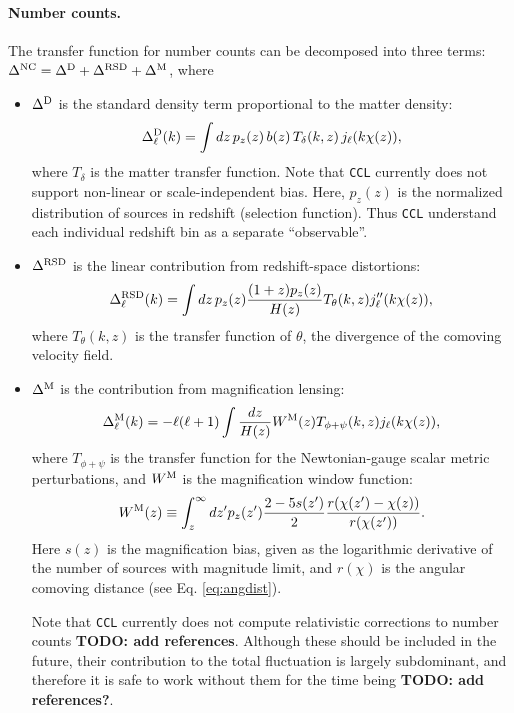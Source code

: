 \documentclass[\docopts]{\docclass}
\begin{document}
\paragraph{\bf Number counts.} The transfer function for number counts can be decomposed into three terms: $\Delta^{\rm NC}=\Delta^{\rm D}+\Delta^{\rm RSD}+\Delta^{\rm M}$, where
\begin{itemize}
  \item $\Delta^{\rm D}$ is the standard density term proportional to the matter density:
        \begin{equation}
          \Delta^{\rm D}_\ell(k)=\int dz\,p_z(z)\,b(z)\,T_\delta(k,z)\,j_\ell(k\chi(z)),
        \end{equation}
        where $T_\delta$ is the matter transfer function. Note that {\tt CCL} currently does not support non-linear or scale-independent bias. Here, $p_z(z)$ is the normalized distribution of sources in redshift (selection function). Thus {\tt CCL} understand each individual redshift bin as a separate ``observable''.
  \item $\Delta^{\rm RSD}$ is the linear contribution from redshift-space distortions:
        \begin{equation}
          \Delta^{\rm RSD}_\ell(k)=\int dz\,p_z(z)\frac{(1+z) p_z(z)}{H(z)}T_\theta(k,z) j_\ell''(k\chi(z)),
        \end{equation}
        where $T_\theta(k,z)$ is the transfer function of $\theta$, the divergence of the comoving velocity field.
  \item $\Delta^{\rm M}$ is the contribution from magnification lensing:
        \begin{equation}
          \Delta_\ell^{\rm M}(k)=-\ell(\ell+1)\int \frac{dz}{H(z)} W^{\rm M}(z) T_{\phi+\psi}(k,z) j_\ell(k\chi(z)),
        \end{equation}
        where $T_{\phi+\psi}$ is the transfer function for the Newtonian-gauge scalar metric perturbations, and $W^{\rm M}$ is the magnification window function:
        \begin{equation}
           W^{\rm M}(z)\equiv\int_z^\infty dz' p_z(z')\frac{2-5s(z')}{2}\frac{r(\chi(z')-\chi(z))}{r(\chi(z'))}.
        \end{equation}
        Here $s(z)$ is the magnification bias, given as the logarithmic derivative of the number of sources with magnitude limit, and $r(\chi)$ is the angular comoving distance (see Eq. \ref{eq:angdist}).
          
        Note that {\tt CCL} currently does not compute relativistic corrections to number counts {\bf TODO: add references}. Although these should be included in the future, their contribution to the total fluctuation is largely subdominant, and therefore it is safe to work without them for the time being {\bf TODO: add references?}.
\end{itemize}
\end{document}
